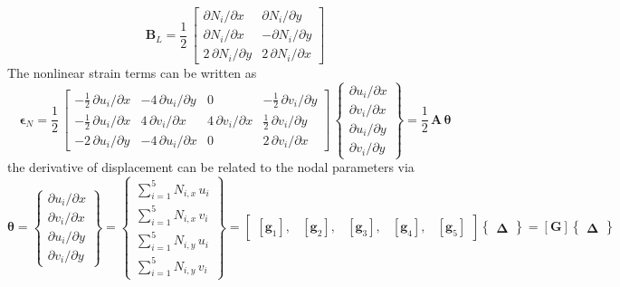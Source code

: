 \begin{equation}
\mathbf{B}_L = \frac{1}{2} \, \begin{bmatrix}
\partial N_i / \partial x &  \partial N_i / \partial y \\
\partial N_i / \partial x & -\partial N_i / \partial y \\
2 \, \partial N_i / \partial y & 2 \, \partial N_i / \partial x \end{bmatrix} 
\end{equation}
The nonlinear strain terms can be written as 
\begin{equation}
\boldsymbol{\epsilon}_ N = \frac{1}{2} \, \begin{bmatrix}
-\frac{1}{2} \, \partial u_i / \partial x &  -4 \, \partial u_i / \partial y & 0 & -\frac{1}{2} \, \partial v_i / \partial y \\
-\frac{1}{2} \, \partial u_i / \partial x &  4 \, \partial v_i / \partial x & 4 \, \partial v_i / \partial x & \frac{1}{2} \, \partial v_i / \partial y \\
-2 \, \partial u_i / \partial y &  -4 \, \partial u_i / \partial x & 0 & 2 \, \partial v_i / \partial x \end{bmatrix} \, \begin{Bmatrix}
\partial u_i / \partial x\\
\partial v_i / \partial x\\
\partial u_i / \partial y\\
\partial v_i / \partial y
\end{Bmatrix}
= \frac{1}{2} \, \mathbf{A} \, \boldsymbol{\theta}
\end{equation}
the derivative of displacement can be related to the nodal parameters via
\begin{equation}
\boldsymbol{\theta} =  \begin{Bmatrix}
\partial u_i / \partial x\\
\partial v_i / \partial x\\
\partial u_i / \partial y\\
\partial v_i / \partial y
\end{Bmatrix}
= \begin{Bmatrix}
\sum\nolimits_{i=1}^5 N_{i,x} \, u_i\\
\sum\nolimits_{i=1}^5 N_{i,x} \, v_i\\
\sum\nolimits_{i=1}^5 N_{i,y} \, u_i\\
\sum\nolimits_{i=1}^5 N_{i,y} \, v_i
\end{Bmatrix} 
= \begin{bmatrix}
[\mathbf{g}_1], & [\mathbf{g}_2], & [\mathbf{g}_3], & [\mathbf{g}_4], & [\mathbf{g}_5] 
\end{bmatrix}  \begin{Bmatrix} \boldsymbol{\Delta} \end{Bmatrix}  
= [\mathbf{G}] \begin{Bmatrix} \boldsymbol{\Delta} \end{Bmatrix} 
\end{equation}
